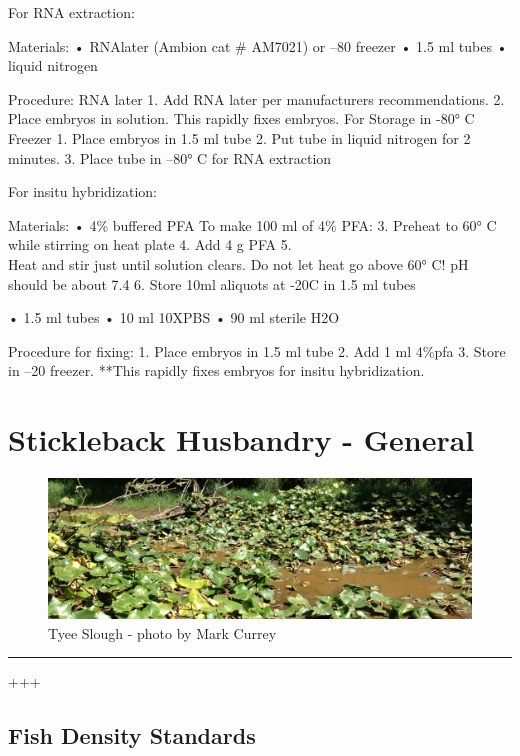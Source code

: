 \documentclass[
]{book}
\begin{document}
For RNA extraction:

Materials:
• RNAlater (Ambion cat \# AM7021) or --80 freezer
• 1.5 ml tubes
• liquid nitrogen

Procedure:
RNA later
1. Add RNA later per manufacturers recommendations.
2. Place embryos in solution. This rapidly fixes embryos.
For Storage in -80° C Freezer
1. Place embryos in 1.5 ml tube
2. Put tube in liquid nitrogen for 2 minutes.
3. Place tube in --80° C for RNA extraction

For insitu hybridization:

Materials:
• 4\% buffered PFA
To make 100 ml of 4\% PFA:
3. Preheat to 60° C while stirring on heat plate
4. Add 4 g PFA
5.\\
Heat and stir just until solution clears. Do not let heat go above 60° C! pH should be about 7.4
6. Store 10ml aliquots at -20C in 1.5 ml tubes

• 1.5 ml tubes
• 10 ml 10XPBS
• 90 ml sterile H2O

Procedure for fixing:
1. Place embryos in 1.5 ml tube
2. Add 1 ml 4\%pfa
3. Store in --20 freezer.
**This rapidly fixes embryos for insitu hybridization.

\hypertarget{stickleback-husbandry---general}{%
\chapter{Stickleback Husbandry - General}\label{stickleback-husbandry---general}}

\begin{figure}
\centering
\includegraphics{images/tyee_slough_header.jpg}
\caption{Tyee Slough - photo by Mark Currey}
\end{figure}

\begin{center}\rule{0.5\linewidth}{0.5pt}\end{center}

+++

\hypertarget{fish-density-standards}{%
\section{Fish Density Standards}\label{fish-density-standards}}
\end{document}
